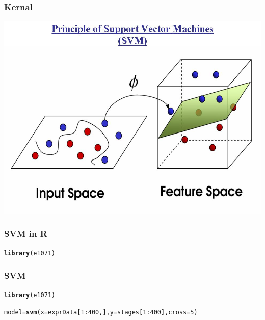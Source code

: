 \documentclass[UTF8]{beamer}\usepackage[]{graphicx}\usepackage[]{color}
\makeatletter
\newcommand{\hlnum}[1]{\textcolor[rgb]{0.686,0.059,0.569}{#1}}%
\newcommand{\hlopt}[1]{\textcolor[rgb]{0,0,0}{#1}}%
\newcommand{\hlstd}[1]{\textcolor[rgb]{0.345,0.345,0.345}{#1}}%
\newcommand{\hlkwb}[1]{\textcolor[rgb]{0.69,0.353,0.396}{#1}}%
\newcommand{\hlkwc}[1]{\textcolor[rgb]{0.333,0.667,0.333}{#1}}%
\newcommand{\hlkwd}[1]{\textcolor[rgb]{0.737,0.353,0.396}{\textbf{#1}}}%
\newenvironment{kframe}{%
 \def\at@end@of@kframe{}%
 \ifinner\ifhmode%
  \def\at@end@of@kframe{\end{minipage}}%
  \begin{minipage}{\columnwidth}%
 \fi\fi%
 \def\FrameCommand##1{\hskip\@totalleftmargin \hskip-\fboxsep
 \colorbox{shadecolor}{##1}\hskip-\fboxsep
     \hskip-\linewidth \hskip-\@totalleftmargin \hskip\columnwidth}%
 \MakeFramed {\advance\hsize-\width
   \@totalleftmargin\z@ \linewidth\hsize
   \@setminipage}}%
 {\par\unskip\endMakeFramed%
 \at@end@of@kframe}
\newenvironment{knitrout}{}{} %
\makeatother
\begin{document}
\begin{frame}
  \frametitle{Kernal}
\centerline{\includegraphics[height=.7\textheight]{kernel.jpg}}
\end{frame}


\begin{frame}[fragile]
  \frametitle{SVM in R}




\begin{knitrout}
\color{fgcolor}\begin{kframe}
\begin{alltt}
 \hlkwd{library}\hlstd{(e1071)}
\end{alltt}
\end{kframe}
\end{knitrout}

\end{frame}

\begin{frame}[fragile]
  \frametitle{SVM}

\begin{knitrout}
\color{fgcolor}\begin{kframe}
\begin{alltt}
 \hlkwd{library}\hlstd{(e1071)}

 \hlstd{model} \hlkwb{=} \hlkwd{svm}\hlstd{(}\hlkwc{x} \hlstd{= exprData[}\hlnum{1}\hlopt{:}\hlnum{400}\hlstd{,],} \hlkwc{y} \hlstd{= stages[}\hlnum{1}\hlopt{:}\hlnum{400}\hlstd{],} \hlkwc{cross}\hlstd{=}\hlnum{5}\hlstd{)}
\end{alltt}
\end{kframe}
\end{knitrout}
\end{frame}
\end{document}

